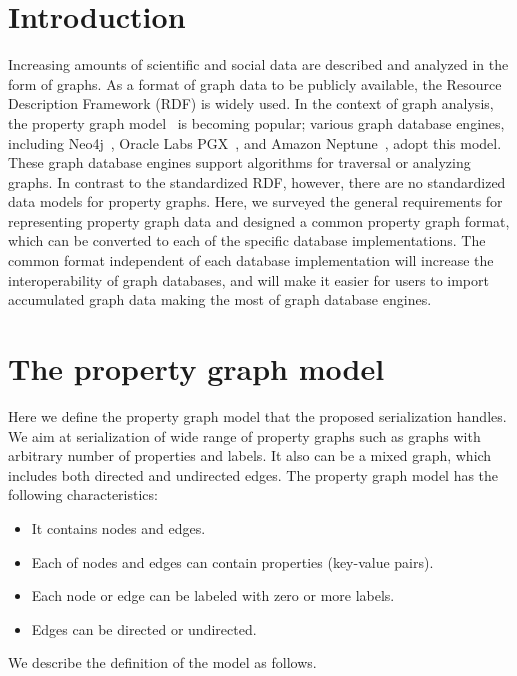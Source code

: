\documentclass[runningheads]{llncs}
\begin{document}
\section{Introduction}
Increasing amounts of scientific and social data are described and analyzed in the form of graphs.
As a format of graph data to be publicly available, the Resource Description Framework (RDF) is widely used. 
In the context of graph analysis, the property graph model~\cite{angles} is becoming popular; various graph database engines, including Neo4j~\cite{neo4j}, Oracle Labs PGX~\cite{pgx}, and Amazon Neptune~\cite{neptune}, adopt this model. These graph database engines support algorithms for traversal or analyzing graphs. 
In contrast to the standardized RDF, however, there are no standardized data models for property graphs.
Here, we surveyed the general requirements for representing property graph data and designed a common property graph format, which can be converted to each of the specific database implementations. The common format independent of each database implementation will increase the interoperability of graph databases, and will make it easier for users to import accumulated graph data making the most of graph database engines.


\section{The property graph model}
Here we define the property graph model that the proposed serialization handles.
We aim at serialization of wide range of property graphs such as graphs with arbitrary number of properties and labels. It also can be a mixed graph, which includes both directed and undirected edges. The property graph model has the following characteristics:

\begin{itemize}
    \item It contains nodes and edges.
    \item Each of nodes and edges can contain properties (key-value pairs).
    \item Each node or edge can be labeled with zero or more labels.
    \item Edges can be directed or undirected.
\end{itemize}
We describe the definition of the model as follows.
\end{document}
